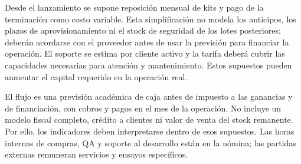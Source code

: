 Desde el lanzamiento se supone reposición mensual de kits y pago de la terminación como costo variable. Esta simplificación no modela los anticipos, los plazos de aprovisionamiento ni el stock de seguridad de los lotes posteriores; deberán acordarse con el proveedor antes de usar la previsión para financiar la operación. El soporte se estima por cliente activo y la tarifa deberá cubrir las capacidades necesarias para atención y mantenimiento. Estos supuestos pueden aumentar el capital requerido en la operación real.

El flujo es una previsión académica de caja antes de impuesto a las ganancias y de financiación, con cobros y pagos en el mes de la operación. No incluye un modelo fiscal completo, crédito a clientes ni valor de venta del stock remanente. Por ello, los indicadores deben interpretarse dentro de esos supuestos. Las horas internas de compras, QA y soporte al desarrollo están en la nómina; las partidas externas remuneran servicios y ensayos específicos.
